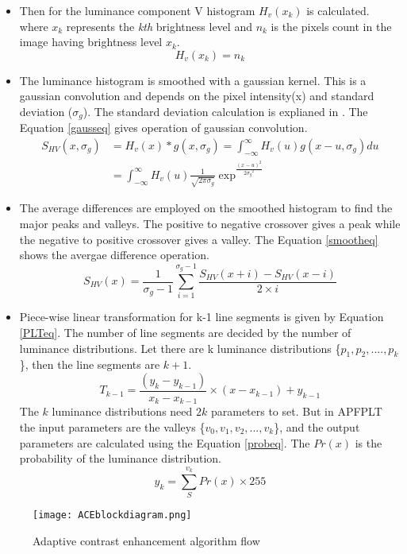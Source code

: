 \begin{itemize}
		\item Then for the luminance component V histogram $H_v(x_k)$ is calculated. where $x_k$ represents the \textit{kth} brightness level and $n_k$ is the pixels count in the image having brightness level $x_k$.
		\begin{equation}\label{histeq}
		H_v(x_k)=n_k
		\end{equation}
		\item The luminance histogram is smoothed with a gaussian kernel. This is a gaussian convolution and depends on the pixel intensity(x) and standard deviation ($\sigma_g$). The standard deviation calculation is explianed in \cite{ACE}. The Equation \ref{gausseq} gives operation of gaussian convolution.
			\begin{equation}\label{gausseq}
			\begin{split}		
			S_{HV}(x,\sigma_g)&=H_v(x)*g(x,\sigma_g)=\int_{-\infty}^{\infty} 	H_v(u)g(x-u,\sigma_g)du\\
			&=\int_{-\infty}^{\infty} 	H_v(u) \frac{1}{\sqrt{2\pi\sigma_g}} \exp^\frac{(x-u)^2}{2{\sigma_g}^2}
			\end{split}
			\end{equation}
			\item The average differences are employed on the smoothed histogram to find the major peaks and valleys. The positive to negative crossover gives a peak while the negative to positive crossover gives a valley. The Equation \ref{smootheq} shows the avergae difference operation.
			\begin{equation}\label{smootheq}
			S_{HV}(x)=\frac{1}{\sigma_g - 1}\sum_{i=1}^{\sigma_g - 1}\frac{S_{HV}(x+i)-S_{HV}(x-i)}{2\times i}
			\end{equation}
			
		\item Piece-wise linear transformation for k-1 line segments is given by Equation \ref{PLTeq}. The number of line segments are decided by the number of luminance distributions. Let there are k luminance distributions \{$p_1,p_2,....,p_k$\}, then the line segments are $k+1$.
		\begin{equation}\label{PLTeq}
		T_{k-1} =\frac{(y_k-y_{k-1})}{x_k-x_{k-1}} \times {(x-x_{k-1})} +y_{k-1}
		\end{equation}
		The $k$ luminance distributions need $2k$ parameters to set. But in APFPLT the input parameters are the valleys \{$v_0,v_1,v_2,...,v_k$\}, and the output parameters are calculated using the Equation \ref{probeq}. The $Pr(x)$ is the probability of the luminance distribution.
		\begin{equation}\label{probeq}
		y_k = \sum_{S}^{v_k} Pr(x) \times 255	
		\end{equation}  

\end{itemize}
\begin{figure}[htb]
	\centering
	\texttt{[image: ACEblockdiagram.png]}
	\caption{Adaptive contrast enhancement algorithm flow}
	\label{ACE}
\end{figure}
